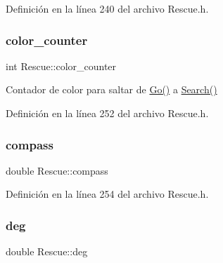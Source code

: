 Definición en la línea 240 del archivo Rescue.\+h.

\mbox{\label{classRescue_a180e2955648c5bae24069da9db0c1a5f_a180e2955648c5bae24069da9db0c1a5f}} 
\subsubsection{\texorpdfstring{color\+\_\+counter}{color\_counter}}
{\footnotesize\ttfamily int Rescue\+::color\+\_\+counter\hspace{0.3cm}{\ttfamily [private]}}



Contador de color para saltar de \hyperlink{classRescue_acfe79ba42004fd73e17e240c0201462a_acfe79ba42004fd73e17e240c0201462a}{Go()} a \hyperlink{classRescue_a3ea9a01b97d0291afa704bff73564938_a3ea9a01b97d0291afa704bff73564938}{Search()} 



Definición en la línea 252 del archivo Rescue.\+h.

\mbox{\label{classRescue_a5783a7f93b5dc970e997a919af57e0bc_a5783a7f93b5dc970e997a919af57e0bc}} 
\subsubsection{\texorpdfstring{compass}{compass}}
{\footnotesize\ttfamily double Rescue\+::compass\hspace{0.3cm}{\ttfamily [private]}}



Definición en la línea 254 del archivo Rescue.\+h.

\mbox{\label{classRescue_ad6febda0e181e1b6847e1b9be0f54e2b_ad6febda0e181e1b6847e1b9be0f54e2b}} 
\subsubsection{\texorpdfstring{deg}{deg}}
{\footnotesize\ttfamily double Rescue\+::deg\hspace{0.3cm}{\ttfamily [private]}}




